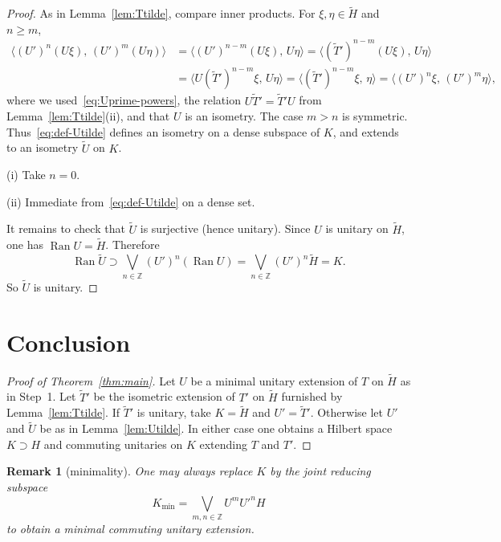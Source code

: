 \documentclass[11pt]{article}
\newtheorem{remark}[theorem]{Remark}
\begin{document}
\begin{proof}
As in Lemma~\ref{lem:Ttilde}, compare inner products. For
\(\xi,\eta\in\widetilde{H}\) and \(n\ge m\),
\begin{align*}
\bigl\langle (U')^n(U\xi),\,(U')^m(U\eta)\bigr\rangle
&=
\bigl\langle (U')^{n-m}(U\xi),\,U\eta\bigr\rangle
=
\bigl\langle (\widetilde{T}')^{n-m}(U\xi),\,U\eta\bigr\rangle
\\
&=
\bigl\langle U(\widetilde{T}')^{n-m}\xi,\,U\eta\bigr\rangle
=
\bigl\langle (\widetilde{T}')^{n-m}\xi,\,\eta\bigr\rangle
=
\bigl\langle (U')^n\xi,\,(U')^m\eta\bigr\rangle,
\end{align*}
where we used~\eqref{eq:Uprime-powers}, the relation
\(U\widetilde{T}'=\widetilde{T}'U\) from Lemma~\ref{lem:Ttilde}(ii), and that \(U\) is
an isometry. The case \(m>n\) is symmetric. Thus~\eqref{eq:def-Utilde} defines an
isometry on a dense subspace of \(K\), and extends to an isometry
\(\widetilde{U}\) on \(K\).

(i) Take \(n=0\).

(ii) Immediate from~\eqref{eq:def-Utilde} on a dense set.

It remains to check that \(\widetilde{U}\) is surjective (hence unitary). Since \(U\) is
unitary on \(\widetilde{H}\), one has \(\operatorname{Ran}U=\widetilde{H}\). Therefore
\[
\operatorname{Ran}\widetilde{U}
\supset
\bigvee_{n\in\mathbb{Z}}(U')^n(\operatorname{Ran}U)
=
\bigvee_{n\in\mathbb{Z}}(U')^n\widetilde{H}
=
K.
\]
So \(\widetilde{U}\) is unitary.
\end{proof}

\bigskip
\section*{Conclusion}

\begin{proof}[Proof of Theorem~\ref{thm:main}]
Let \(U\) be a minimal unitary extension of \(T\) on \(\widetilde{H}\) as in
Step~1. Let \(\widetilde{T}'\) be the isometric extension of \(T'\) on
\(\widetilde{H}\) furnished by Lemma~\ref{lem:Ttilde}. If \(\widetilde{T}'\) is unitary,
take \(K=\widetilde{H}\) and \(U'=\widetilde{T}'\). Otherwise let \(U'\) and
\(\widetilde{U}\) be as in Lemma~\ref{lem:Utilde}. In either case one obtains a
Hilbert space \(K\supset H\) and commuting unitaries on \(K\) extending \(T\) and
\(T'\).
\end{proof}

\begin{remark}[minimality]
One may always replace \(K\) by the joint reducing subspace
\[
K_{\min}=\bigvee_{m,n\in\mathbb{Z}}U^m{U'}^n H
\]
to obtain a minimal commuting unitary extension.
\end{remark}
\end{document}
